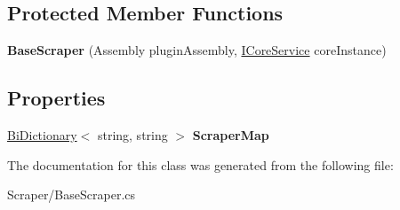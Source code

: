 \subsection*{Protected Member Functions}
\begin{DoxyCompactItemize}
\item 
\hypertarget{class_snowflake_1_1_scraper_1_1_base_scraper_aea32ff122e553624603664ff0ca41b56}{}{\bfseries Base\+Scraper} (Assembly plugin\+Assembly, \hyperlink{interface_snowflake_1_1_service_1_1_i_core_service}{I\+Core\+Service} core\+Instance)\label{class_snowflake_1_1_scraper_1_1_base_scraper_aea32ff122e553624603664ff0ca41b56}

\end{DoxyCompactItemize}
\subsection*{Properties}
\begin{DoxyCompactItemize}
\item 
\hypertarget{class_snowflake_1_1_scraper_1_1_base_scraper_ac1f0943f27012e1558e55ee89febf270}{}\hyperlink{class_snowflake_1_1_utility_1_1_bi_dictionary}{Bi\+Dictionary}$<$ string, string $>$ {\bfseries Scraper\+Map}\label{class_snowflake_1_1_scraper_1_1_base_scraper_ac1f0943f27012e1558e55ee89febf270}

\end{DoxyCompactItemize}


The documentation for this class was generated from the following file\+:\begin{DoxyCompactItemize}
\item 
Scraper/Base\+Scraper.\+cs\end{DoxyCompactItemize}
